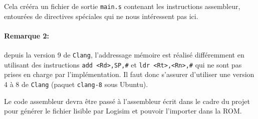 \documentclass{article}
\begin{document}
    Cela crééra un fichier de sortie \texttt{main.s} contenant les instructions assembleur, entourées de directives spéciales qui ne nous intéressent pas ici.

    \paragraph{Remarque 2:} depuis la version 9 de \texttt{Clang}, l'addressage mémoire est réalisé différemment en utilisant des instructions \texttt{add <Rd>,SP,\#<imm8>} et \texttt{ldr <Rt>,<Rn>,\#<imm5>} qui ne sont pas prises en charge par l'implémentation.
    Il faut donc s'assurer d'utiliser une version 4 à 8 de \texttt{Clang} (paquet \texttt{clang-8} sous Ubuntu).

    Le code assembleur devra être passé à l'assembleur écrit dans le cadre du projet pour générer le fichier lisible par Logisim et pouvoir l'importer dans la ROM.
\end{document}
